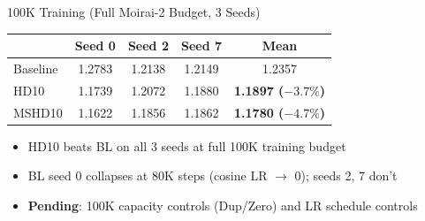 \documentclass[aspectratio=169,11pt]{beamer}
\begin{document}
\begin{frame}{100K Training (Full Moirai-2 Budget, 3 Seeds)}

\begin{table}
\centering
\footnotesize
\begin{tabular}{lcccc}
\toprule
& Seed 0 & Seed 2 & Seed 7 & Mean \\
\midrule
Baseline & 1.2783 & 1.2138 & 1.2149 & 1.2357 \\
HD10 & 1.1739 & 1.2072 & 1.1880 & \textcolor{improve}{\textbf{1.1897 ($-3.7\%$)}} \\
MSHD10 & 1.1622 & 1.1856 & 1.1862 & \textcolor{improve}{\textbf{1.1780 ($-4.7\%$)}} \\
\bottomrule
\end{tabular}
\end{table}

\medskip

\begin{itemize}
    \item HD10 beats BL on all 3 seeds at full 100K training budget
    \item BL seed 0 collapses at 80K steps (cosine LR $\rightarrow$ 0); seeds 2, 7 don't
    \item \textbf{Pending}: 100K capacity controls (Dup/Zero) and LR schedule controls
\end{itemize}

\end{frame}
\end{document}
